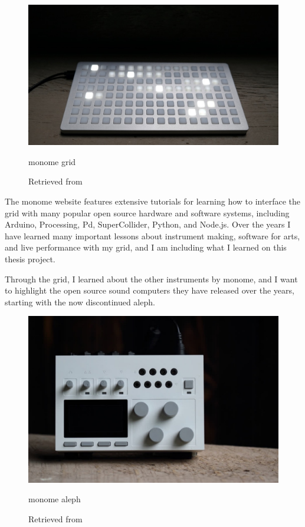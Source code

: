 \begin{figure}[ht]
  \centering
  \includegraphics[width=0.75\linewidth,height=0.25\textheight,keepaspectratio]{images/monome-grid.jpg}
  \caption{monome grid}
  \caption*{Retrieved from \cite{website-monome-current}}
  \label{fig:monome-grid}
\end{figure}

The monome website features extensive tutorials for learning how to interface the grid with many popular open source hardware and software systems, including Arduino, Processing, \acrshort{Pd}, SuperCollider, Python, and Node.js. Over the years I have learned many important lessons about instrument making, software for arts, and live performance with my grid, and I am including what I learned on this thesis project.

Through the grid, I learned about the other instruments by monome, and I want to highlight the open source sound computers they have released over the years,  starting with the now discontinued aleph.

\begin{figure}[ht]
  \centering
  \includegraphics[width=0.75\linewidth,height=0.25\textheight,keepaspectratio]{images/monome-aleph.jpg}
  \caption{monome aleph}
  \caption*{Retrieved from \cite{website-monome-current}}
  \label{fig:monome-aleph}
\end{figure}

